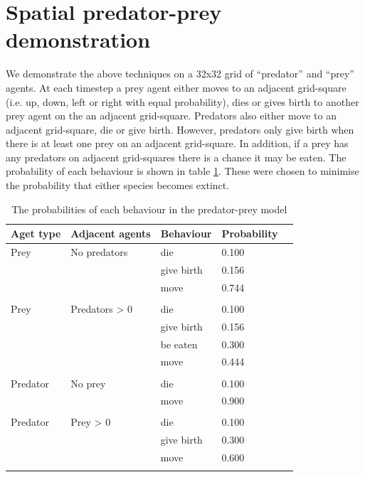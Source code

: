 \documentclass{article}
\begin{document}
\section{Spatial predator-prey demonstration}

We demonstrate the above techniques on a 32x32 grid of ``predator'' and ``prey'' agents. At each timestep a prey agent either moves to an adjacent grid-square (i.e. up, down, left or right with equal probability), dies or gives birth to another prey agent on the an adjacent grid-square. Predators also either move to an adjacent grid-square, die or give birth. However, predators only give birth when there is at least one prey on an adjacent grid-square. In addition, if a prey has any predators on adjacent grid-squares there is a chance it may be eaten. The probability of each behaviour is shown in table \ref{rates}. These were chosen to minimise the probability that either species becomes extinct.

\begin{table}
	\begin{center}
		\begin{tabular}{llllc}
		\hline
		Aget type & Adjacent agents & Behaviour & Probability\\
		\hline
		Prey & No predators & die &        0.100\\
			& & give birth &        0.156\\
			& & move &        0.744\\
			& &&\\
		Prey & Predators > 0 & die &        0.100\\
			& & give birth &        0.156\\
			& & be eaten &        0.300\\
			& & move &        0.444\\
			& &&\\
		Predator  & No prey & die  &      0.100\\
			& & move &        0.900\\
			& &&\\
		Predator  & Prey > 0 & die  &      0.100\\
			& & give birth &        0.300\\
			& & move &        0.600\\
		\hline& 
		\end{tabular}
	\end{center}
	\caption{The probabilities of each behaviour in the predator-prey model}
	\label{rates}
\end{table}
\end{document}
